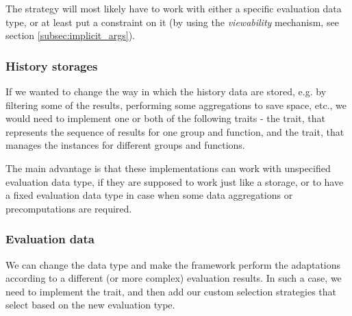 The strategy will most likely have to work with either a specific evaluation data type, or at least put a constraint on it (by using the \textit{viewability} mechanism, see section \ref{subsec:implicit_args}).

\subsubsection{History storages}

If we wanted to change the way in which the history data are stored, e.g. by filtering some of the results, performing some aggregations to save space, etc., we would need to implement one or both of the following traits - the  trait, that represents the sequence of results for one group and function, and the  trait, that manages the  instances for different groups and functions.

The main advantage is that these implementations can work with unspecified evaluation data type, if they are supposed to work just like a storage, or to have a fixed evaluation data type in case when some data aggregations or precomputations are required.

\subsubsection{Evaluation data}

We can change the  data type and make the framework perform the adaptations according to a different (or more complex) evaluation results. In such a case, we need to implement the  trait, and then add our custom selection strategies that select based on the new evaluation type.